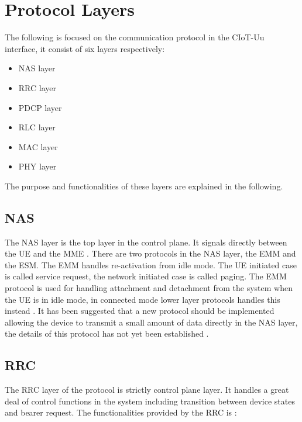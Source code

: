 \section{Protocol Layers}

The following is focused on the communication protocol in the \gls{CIoT}-Uu interface, it consist of six layers respectively:
\begin{itemize}
	\item \gls{NAS} layer
	\item \gls{RRC} layer
	\item \gls{PDCP} layer
	\item \gls{RLC} layer
	\item \gls{MAC} layer
	\item \gls{PHY} layer
\end{itemize}

The purpose and functionalities of these layers are explained in the following.

\subsection{NAS}
The \gls{NAS} layer is the top layer in the control plane. It signals directly between the \gls{UE} and the \gls{MME} \citep[ch. 3]{book_LTE_for_UMTS}. There are two protocols in the \gls{NAS} layer, the \gls{EMM} and the \gls{ESM}. The \gls{EMM} handles re-activation from idle mode. The \gls{UE} initiated case is called service request, the network initiated case is called paging. The \gls{EMM} protocol is used for handling attachment and detachment from the system when the \gls{UE} is in idle mode, in connected mode lower layer protocols handles this instead \citep[ch. 3]{book_LTE_for_UMTS}. It has been suggested that a new protocol should be implemented allowing the device to transmit a small amount of data directly in the \gls{NAS} layer, the details of this protocol has not yet been established \citep{REL-13}. 

\subsection{RRC} \label{sec:RRC}
The \gls{RRC} layer of the protocol is strictly control plane layer. It handles a great deal of control functions in the system including transition between device states and bearer request. The functionalities provided by the \gls{RRC} is \citep[ch. 6.6]{book_LTE_for_UMTS}:

